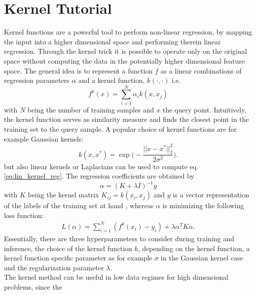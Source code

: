\documentclass[9pt,bestpractices]{livecoms}
\begin{document}
\section{Kernel Tutorial}
Kernel functions are a powerful tool to perform non-linear regression, by
mapping the input into a higher dimensional space and performing therein linear
regression. Through the kernel trick it is possible to operate only on the
original space without computing the data in the potentially higher dimensional
feature space.  The general idea is to represent a function $f$ as a linear
combinations of regression parameters $\alpha$ and a kernel function, $k( \cdot, \cdot)$ i.e.
\begin{equation}
    f^{k}(x) = \sum_{i=1}^{N} \alpha_i k(x, x_j)
    \label{eq:lin_kernel_reg}
\end{equation}
with $N$ being the number of training samples and $x$ the query point.
Intuitively, the kernel function serves as similarity measure and finds the
closest point in the training set to the query sample.
A popular choice of kernel functions are for example Gaussian kernels:
\begin{equation*}
    k(x, x^{*}) = \exp \biggl( - \frac{|| x-x^{*} ||_{2}^2}{2 \sigma^2} \biggr).
\end{equation*}
but also linear kernels or Laplacians can be used to compute eq.
\ref{eq:lin_kernel_reg}. The regression coefficients are obtained by
\begin{equation*}
    \alpha = (K + \lambda I)^{-1} y
\end{equation*}
with $K$ being the kernel matrix $K_{ij} = k(x_i, x_j)$ and $y$ is a vector
representation of the labels of the training set at hand
\cite{vuUnderstandingKernelRidge2015}, whereas $\alpha$ is minimizing the following
loss function:
\begin{align*}
    L(\alpha) = \sum_{i=1}^N (f^k(x_i) - y_i) + \lambda \alpha^T K \alpha.
\end{align*}
Essentially, there are three hyperparameters to consider during training and
inference, the choice of the kernel function $k$, depending on the kernel
function, a kernel function specific parameter as for example $\sigma$ in the
Gaussian kernel case and the regularization parameter $\lambda$.  \\ The kernel method
can be useful in low data regimes for high dimensional problems, since the
\end{document}
